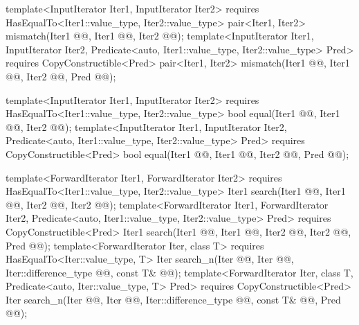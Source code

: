 \documentclass[american,twoside]{book}
\begin{document}
\begin{paras}
\begin{codeblock}
{  template<InputIterator Iter1, InputIterator Iter2>
    requires HasEqualTo<Iter1::value_type, Iter2::value_type>
    pair<Iter1, Iter2> mismatch(Iter1 @@, Iter1 @@,
                                Iter2 @@);
  template<InputIterator Iter1, InputIterator Iter2,
           Predicate<auto, Iter1::value_type, Iter2::value_type> Pred>
    requires CopyConstructible<Pred>
    pair<Iter1, Iter2> mismatch(Iter1 @@, Iter1 @@,
                                Iter2 @@, Pred @@);

  template<InputIterator Iter1, InputIterator Iter2>
    requires HasEqualTo<Iter1::value_type, Iter2::value_type>
    bool equal(Iter1 @@, Iter1 @@,
               Iter2 @@);
  template<InputIterator Iter1, InputIterator Iter2,
           Predicate<auto, Iter1::value_type, Iter2::value_type> Pred>
    requires CopyConstructible<Pred>
    bool equal(Iter1 @@, Iter1 @@,
               Iter2 @@, Pred @@);

  template<ForwardIterator Iter1, ForwardIterator Iter2>
    requires HasEqualTo<Iter1::value_type, Iter2::value_type>
    Iter1 search(Iter1 @@, Iter1 @@,
                 Iter2 @@, Iter2 @@);
  template<ForwardIterator Iter1, ForwardIterator Iter2,
           Predicate<auto, Iter1::value_type, Iter2::value_type> Pred>
    requires CopyConstructible<Pred>
    Iter1 search(Iter1 @@, Iter1 @@,
                 Iter2 @@, Iter2 @@,
                 Pred @@);
  template<ForwardIterator Iter, class T>
    requires HasEqualTo<Iter::value_type, T>
    Iter search_n(Iter @@, Iter @@, Iter::difference_type @@,
                  const T& @@);
  template<ForwardIterator Iter, class T,
           Predicate<auto, Iter::value_type, T> Pred>
    requires CopyConstructible<Pred>
    Iter search_n(Iter @@, Iter @@, Iter::difference_type @@,
                  const T& @@, Pred @@);

}
\end{codeblock}
\end{paras}
\end{document}
